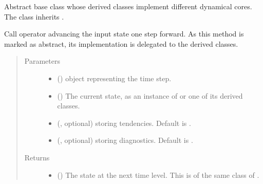 \documentclass[letterpaper,10pt,english]{sphinxmanual}
\begin{document}
\begin{fulllineitems}
\label{\detokenize{api:tasmania.dycore.dycore.DynamicalCore}}
Abstract base class whose derived classes implement different dynamical cores.
The class inherits .

\begin{fulllineitems}
\label{\detokenize{api:tasmania.dycore.dycore.DynamicalCore.__call__}}
Call operator advancing the input state one step forward.
As this method is marked as abstract, its implementation is delegated to the derived classes.
\begin{quote}\begin{description}
\item[{Parameters}] \leavevmode\begin{itemize}
\item {} 
 () \textendash{}  object representing the time step.

\item {} 
 () \textendash{} The current state, as an instance of {\hyperref[\detokenize{api:tasmania.storages.grid_data.GridData}]{}} or one of its derived classes.

\item {} 
 (, optional) \textendash{} {\hyperref[\detokenize{api:tasmania.storages.grid_data.GridData}]{}} storing tendencies. Default is .

\item {} 
 (, optional) \textendash{} {\hyperref[\detokenize{api:tasmania.storages.grid_data.GridData}]{}} storing diagnostics. Default is .

\end{itemize}

\item[{Returns}] \leavevmode
\begin{itemize}
\item {} 
 () \textendash{} The state at the next time level. This is of the same class of .


\end{itemize}
\end{description}
\end{quote}
\end{fulllineitems}
\end{fulllineitems}
\end{document}
